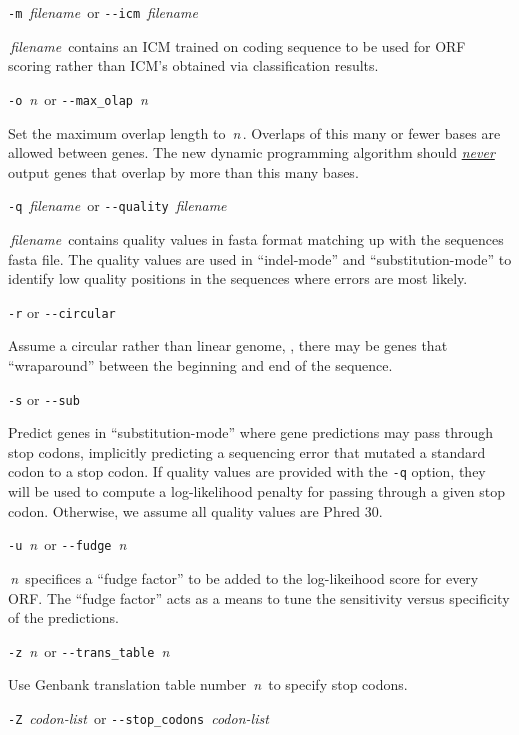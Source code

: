 \documentclass[fleqn,titlepage,11pt]{article}
\def\Desc#1{\,\mbox{\emph{#1}}\,}
\begin{document}
\exdent
  \verb`-m` \Desc{filename} \enskip or \enskip \verb`--icm` \Desc{filename}

  \Desc{filename} contains an ICM trained on coding sequence to be used
  for ORF scoring rather than ICM's obtained via classification results.

\exdent
  \verb`-o` \Desc{n} \enskip or \enskip \verb`--max_olap` \Desc{n}

  Set the maximum overlap length to \Desc{n}.  Overlaps of this
  many or fewer bases are allowed between genes.  The new
  dynamic programming algorithm should \underline{\emph{never}}
  output genes that overlap by more than this many bases.

\exdent
  \verb`-q` \Desc{filename} \enskip or \enskip \verb`--quality` \Desc{filename}

  \Desc{filename} contains quality values in fasta format matching up
  with the sequences fasta file. The quality values are used in
  ``indel-mode'' and ``substitution-mode'' to identify low quality
  positions in the sequences where errors are most likely.

\exdent
  \verb`-r` \enskip or \enskip \verb`--circular`

  Assume a circular rather than linear genome, \ie, there may
  be genes that ``wraparound'' between the beginning and end
  of the sequence.

\exdent
  \verb`-s` \enskip or \enskip \verb`--sub`

  Predict genes in ``substitution-mode'' where gene predictions may
  pass through stop codons, implicitly predicting a sequencing error
  that mutated a standard codon to a stop codon. If quality values are
  provided with the \verb`-q` option, they will be used to compute a
  log-likelihood penalty for passing through a given stop
  codon. Otherwise, we assume all quality values are Phred 30.

\exdent
  \verb`-u` \Desc{n} \enskip or \enskip \verb`--fudge` \Desc{n}

  \Desc{n} specifices a ``fudge factor'' to be added to the
  log-likeihood score for every ORF. The ``fudge factor'' acts as a
  means to tune the sensitivity versus specificity of the predictions.
  
\exdent
  \verb`-z` \Desc{n} \enskip or \enskip \verb`--trans_table` \Desc{n}

  Use Genbank translation table number \Desc{n} to specify stop codons.

\exdent
  \verb`-Z` \Desc{codon-list} \enskip or \enskip \verb`--stop_codons` \Desc{codon-list}
\end{document}

